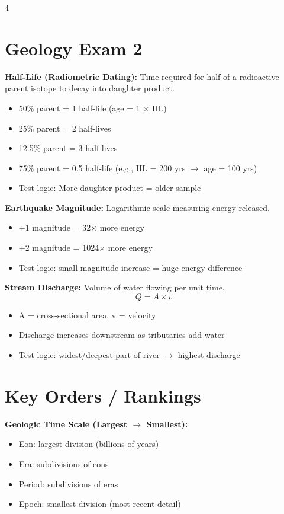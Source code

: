 \documentclass[10pt]{article}
\begin{document}
\begin{multicols}{4}

\section*{Geology Exam 2}

\textbf{Half-Life (Radiometric Dating):}
Time required for half of a radioactive parent isotope to decay into daughter product.
\begin{itemize}
\item 50\% parent = 1 half-life (age = 1 $\times$ HL)
\item 25\% parent = 2 half-lives
\item 12.5\% parent = 3 half-lives
\item 75\% parent = 0.5 half-life (e.g., HL = 200 yrs $\rightarrow$ age = 100 yrs)
\item Test logic: More daughter product = older sample
\end{itemize}

\textbf{Earthquake Magnitude:}
Logarithmic scale measuring energy released.
\begin{itemize}
\item +1 magnitude = 32$\times$ more energy
\item +2 magnitude = 1024$\times$ more energy
\item Test logic: small magnitude increase = huge energy difference
\end{itemize}

\textbf{Stream Discharge:}
Volume of water flowing per unit time.
\[
Q = A \times v
\]
\begin{itemize}
\item A = cross-sectional area, v = velocity
\item Discharge increases downstream as tributaries add water
\item Test logic: widest/deepest part of river $\rightarrow$ highest discharge
\end{itemize}

\section*{Key Orders / Rankings}

\textbf{Geologic Time Scale (Largest $\rightarrow$ Smallest):}
\begin{itemize}
\item Eon: largest division (billions of years)
\item Era: subdivisions of eons
\item Period: subdivisions of eras
\item Epoch: smallest division (most recent detail)
\end{itemize}


\end{multicols}
\end{document}
